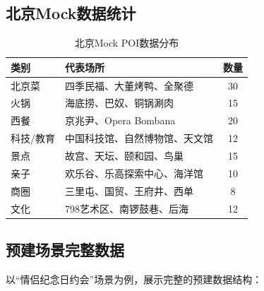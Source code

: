 \documentclass[12pt,a4paper]{ctexart}
\begin{document}
\subsection{北京Mock数据统计}

\begin{table}[H]
\centering
\caption{北京Mock POI数据分布}
\label{tab:beijing-mock}
\renewcommand{\arraystretch}{1.3}
\begin{tabularx}{\textwidth}{lXc}
\toprule
\textbf{类别} & \textbf{代表场所} & \textbf{数量} \\
\midrule
北京菜 & 四季民福、大董烤鸭、全聚德 & 30 \\
火锅 & 海底捞、巴奴、铜锅涮肉 & 15 \\
西餐 & 京兆尹、Opera Bombana & 20 \\
科技/教育 & 中国科技馆、自然博物馆、天文馆 & 12 \\
景点 & 故宫、天坛、颐和园、鸟巢 & 15 \\
亲子 & 欢乐谷、乐高探索中心、海洋馆 & 10 \\
商圈 & 三里屯、国贸、王府井、西单 & 8 \\
文化 & 798艺术区、南锣鼓巷、后海 & 12 \\
\bottomrule
\end{tabularx}
\end{table}

\subsection{预建场景完整数据}

以``情侣纪念日约会''场景为例，展示完整的预建数据结构：
\end{document}
